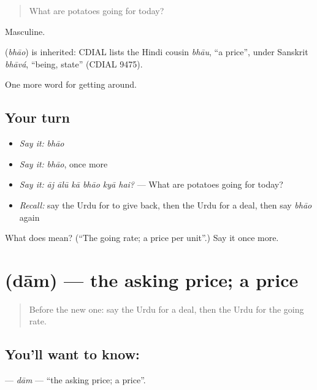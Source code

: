 \begin{quote}
What are potatoes going for today?
\end{quote}

Masculine.

\begin{cousinweb}
\textbf{} (\emph{bhāo}) is inherited: CDIAL lists the Hindi cousin \emph{bhāu}, \textquotedblleft{}a price\textquotedblright{}, under Sanskrit \emph{bhāvá}, \textquotedblleft{}being, state\textquotedblright{} (CDIAL 9475).
\end{cousinweb}

\begin{grammarlens}[title={What you've built}]
One more word for getting around.
\end{grammarlens}

\subsection*{Your turn}
\begin{itemize}
\raggedright
  \item \emph{Say it:} \emph{bhāo}
  \item \emph{Say it:} \emph{bhāo}, once more
  \item \emph{Say it:} \emph{āj ālū kā bhāo kyā hai?} — What are potatoes going for today?
  \item \emph{Recall:} say the Urdu for to give back, then the Urdu for a deal, then say \emph{bhāo} again
\end{itemize}

\begin{tcolorbox}[breakable,colback=teal!4,colframe=teal!35!black,title={Before you move on}]
What does  mean? (\textquotedblleft{}The going rate; a price per unit\textquotedblright{}.) Say it once more.
\end{tcolorbox}
\section[\texorpdfstring{\ur{دام} (dām)}{دام (dām)}]{ (dām) — the asking price; a price}

\label{lesson:UR-C423-dam}



\begin{quote}
Before the new one: say the Urdu for a deal, then the Urdu for the going rate.
\end{quote}

\subsection*{You'll want to know: }
\textbf{} — \emph{dām} — \textquotedblleft{}the asking price; a price\textquotedblright{}.

